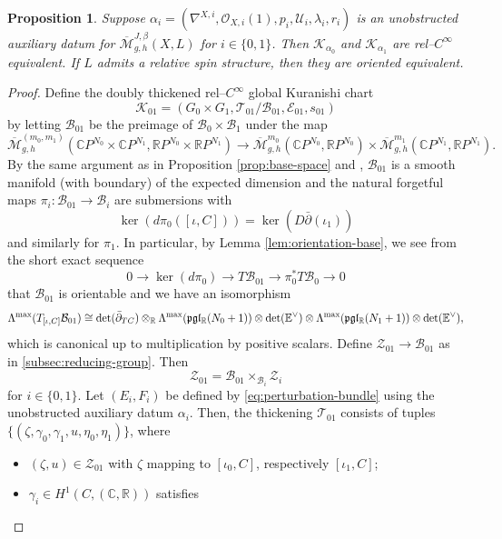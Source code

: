 \documentclass[11pt,psamsfonts, oneside, reqno]{amsart}
\newcommand{\cl}{\colon}
\newcommand{\conn}{\nabla}
\newcommand{\dul}{^\vee}
\newcommand{\Mbar}{\overline{\mathcal M}}
\newcommand{\delbar}{\bar\partial}
\newcommand{\bC}{\mathbb{C}}
\newcommand{\bE}{\mathbb{E}}
\newcommand{\bR}{\mathbb{R}}
\newcommand{\cB}{\mathcal{B}}
\newcommand{\cE}{\mathcal{E}}
\newcommand{\cK}{\mathcal{K}}
\newcommand{\cO}{\mathcal{O}}
\newcommand{\cT}{\mathcal{T}}
\newcommand{\cU}{\mathcal{U}}
\newcommand{\cZ}{\mathcal{Z}}
\newcommand{\fg}{\mathfrak{g}}
\newcommand{\fl}{\mathfrak{l}}
\newcommand{\fp}{\mathfrak{p}}
\newcommand{\hodge}{\bE\dul}
\newcommand{\obs}{s}
\newtheorem{proposition}[theorem]{Proposition}
\theoremstyle{definition}
\theoremstyle{remark}
\numberwithin{equation}{section}
\begin{document}
\begin{proposition}\label{prop:uniqueness-up-to-equivalence} Suppose $\alpha_i = (\conn^{X,i},\cO_{X,i}(1),p_i,\cU_i,\lambda_i,r_i)$ is an unobstructed auxiliary datum for $\Mbar_{g,h}^{J,\beta}(X,L)$ for $i \in \{0,1\}$. Then $\cK_{\alpha_0}$ and $\cK_{\alpha_1}$ are rel--$C^\infty$ equivalent. If $L$ admits a relative spin structure, then they are oriented equivalent.
\end{proposition}

\begin{proof} Define the doubly thickened rel--$C^\infty$ global Kuranishi chart 
		$$\cK_{01} = (G_0\times G_1,\cT_{01}/\cB_{01},\cE_{01},\obs_{01})$$ 
		by letting $\cB_{01}$ be the preimage of $\cB_0\times\cB_1$ under the map 
		$$\Mbar_{g,h}^{(m_0,m_1)}(\bC P^{N_0}\times \bC P^{N_1},\bR P^{N_0}\times \bR P^{N_1})\to \Mbar_{g,h}^{m_0}(\bC P^{N_0}, \bR P^{N_0})\times \Mbar_{g,h}^{m_1}(\bC P^{N_1}, \bR P^{N_1}).$$ 
		By the same argument as in Proposition \ref{prop:base-space} and \cite[Lemma~3.2]{HS22}, $\cB_{01}$ is a smooth manifold (with boundary) of the expected dimension and the natural forgetful maps $\pi_i\cl \cB_{01}\to\cB_i$ are submersions with  
		\begin{equation}\label{eq:orientation-double-base}\ker(d\pi_0([\iota,C])) = \ker(D\delbar(\iota_1)) \end{equation}
		and similarly for $\pi_1$.
		In particular, by Lemma \ref{lem:orientation-base}, we see from the short exact sequence  $$0 \to \ker(d\pi_0)\to T\cB_{01} \to \pi_0^*T\cB_0\to 0$$ 
		that $\cB_{01}$ is orientable and we have an isomorphism
		$$\Lambda^{\normalfont\text{max}}(T_{[\iota,C]}\cB_{01}) \cong \det(\delbar_{TC}) \otimes_\bR\Lambda^{\normalfont\text{max}}(\fp\fg\fl_\bR(N_0+1))\otimes \det(\hodge)\otimes \Lambda^{\normalfont\text{max}}(\fp\fg\fl_\bR(N_1+1))\otimes\det(\hodge),$$
		which is canonical up to multiplication by positive scalars.
		Define $\cZ_{01}\to \cB_{01}$ as in \textsection\ref{subsec:reducing-group}. Then 
		$$\cZ_{01} = \cB_{01}\times_{\cB_i}\cZ_i$$ 
		for $i \in \{0,1\}$.
		Let $(E_i,F_i)$ be defined by \eqref{eq:perturbation-bundle} using the unobstructed auxiliary datum $\alpha_i$. Then, the thickening $\cT_{01}$ consists of tuples $\{(\zeta,\gamma_0,\gamma_1,u,\eta_0,\eta_1)\}$, where
		 \begin{itemize}[leftmargin=20pt]
		 	\item $(\zeta,u)\in \cZ_{01}$ with $\zeta$ mapping to $[\iota_0,C]$, respectively $[\iota_1,C]$;
		 	\item $\gamma_i \in H^1(C,(\bC,\bR))$ satisfies 

\end{itemize}
\end{proof}
\end{document}
